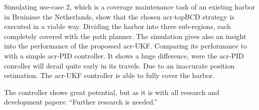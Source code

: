 Simulating use-case 2, which is a coverage maintenance task of an existing harbor in Bruinisse the Netherlands, show 
that the chosen \gls{acr-topBCD} strategy is executed in a viable way. Dividing the harbor into three sub-regions, each
completely covered with the path planner. The simulation gives also an insight into the performance of the propossed 
\gls{acr-UKF}. Comparing its performance to with a simple \gls{acr-PID} controller. It shows a huge difference, were 
the \gls{acr-PID} conroller will derail quite early in its travels. Due to an inaccurate position estimation. The 
\gls{acr-UKF} controller is able to fully cover the harbor. 

\medskip\newline
\noindent The controller shows great potential, but as it is with all research and development papers: ``Further 
research is needed.''

